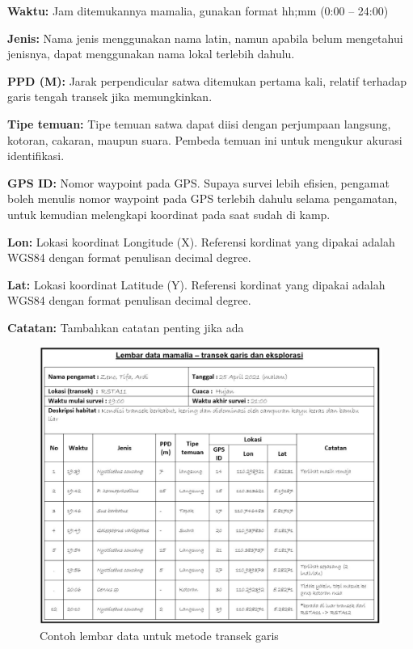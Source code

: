 \documentclass[
]{book}
\begin{document}
\textbf{Waktu:} Jam ditemukannya mamalia, gunakan format hh;mm (0:00 -- 24:00)

\textbf{Jenis:} Nama jenis menggunakan nama latin, namun apabila belum mengetahui jenisnya, dapat menggunakan nama lokal terlebih dahulu.

\textbf{PPD (M):} Jarak perpendicular satwa ditemukan pertama kali, relatif terhadap garis tengah transek jika memungkinkan.

\textbf{Tipe temuan:} Tipe temuan satwa dapat diisi dengan perjumpaan langsung, kotoran, cakaran, maupun suara. Pembeda temuan ini untuk mengukur akurasi identifikasi.

\textbf{GPS ID:} Nomor waypoint pada GPS. Supaya survei lebih efisien, pengamat boleh menulis nomor waypoint pada GPS terlebih dahulu selama pengamatan, untuk kemudian melengkapi koordinat pada saat sudah di kamp.

\textbf{Lon:} Lokasi koordinat Longitude (X). Referensi kordinat yang dipakai adalah WGS84 dengan format penulisan decimal degree.

\textbf{Lat:} Lokasi koordinat Latitude (Y). Referensi kordinat yang dipakai adalah WGS84 dengan format penulisan decimal degree.

\textbf{Catatan:} Tambahkan catatan penting jika ada

\begin{figure}

{\centering \includegraphics[width=1\linewidth]{images/ldm_tg} 

}

\caption{Contoh lembar data untuk metode transek garis}\label{fig:ldmtg}
\end{figure}
\end{document}
